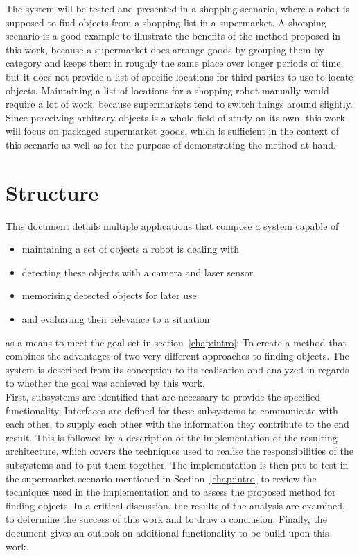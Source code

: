 The system will be tested and presented in a shopping scenario, where a robot is supposed to find objects from a shopping list in a supermarket. A shopping scenario is a good example to illustrate the benefits of the method proposed in this work, because a supermarket does arrange goods by grouping them by category and keeps them in roughly the same place over longer periods of time, but it does not provide a list of specific locations for third-parties to use to locate objects. Maintaining a list of locations for a shopping robot manually would require a lot of work, because supermarkets tend to switch things around slightly. \\

Since perceiving arbitrary objects is a whole field of study on its own, this work will focus on packaged supermarket goods, which is sufficient in the context of this scenario as well as for the purpose of demonstrating the method at hand.

\section{Structure}
This document details multiple applications that compose a system capable of
\begin{itemize}
  \itemsep 0em
  \item maintaining a set of objects a robot is dealing with
  \item detecting these objects with a camera and laser sensor
  \item memorising detected objects for later use
  \item and evaluating their relevance to a situation
\end{itemize}
as a means to meet the goal set in section~\ref{chap:intro}: To create a method that combines the advantages of two very different approaches to finding objects. The system is described from its conception to its realisation and analyzed in regards to whether the goal was achieved by this work. \\

First, subsystems are identified that are necessary to provide the specified functionality. Interfaces are defined for these subsystems to communicate with each other, to supply each other with the information they contribute to the end result. This is followed by a description of the implementation of the resulting architecture, which covers the techniques used to realise the responsibilities of the subsystems and to put them together. The implementation is then put to test in the supermarket scenario mentioned in Section~\ref{chap:intro} to review the techniques used in the implementation and to assess the proposed method for finding objects. In a critical discussion, the results of the analysis are examined, to determine the success of this work and to draw a conclusion. Finally, the document gives an outlook on additional functionality to be build upon this work.
